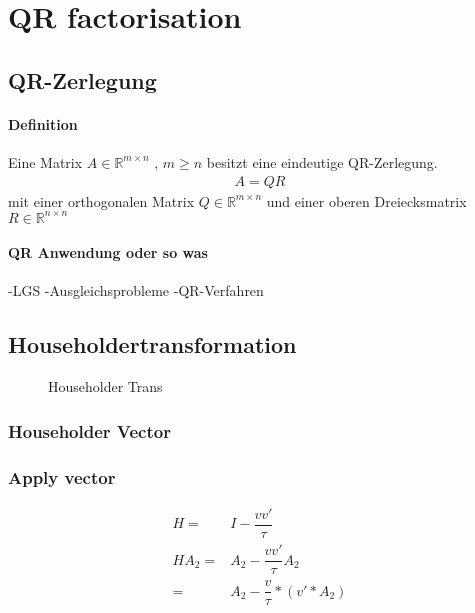 \chapter{QR factorisation}

\section{QR-Zerlegung}
\subsubsection{Definition}
Eine Matrix $A \in \mathbb{R}^{m \times n}$ , $m \ge n$ besitzt eine eindeutige QR-Zerlegung.
\begin{align}
	A = QR
\end{align}
mit einer orthogonalen Matrix $ Q \in \mathbb{R}^{m \times n} $ und einer oberen Dreiecksmatrix $ R \in \mathbb{R}^{n \times n}$ 


\subsubsection{QR Anwendung oder so was}
-LGS 
-Ausgleichsprobleme 
-QR-Verfahren 

\section{Householdertransformation}
\begin{figure} 
	
	\caption{Householder Trans}
	\label{fig:patrA}
\end{figure}
\subsection{Householder Vector}
\subsection{Apply vector}
\begin{align}
H =& I - \dfrac{vv'}{\tau}\\ 
H A_2 =& A_2 - \dfrac{vv'}{\tau}A_2\\
=& A_2 - \dfrac{v}{\tau}*(v'*A_2)
\end{align}

